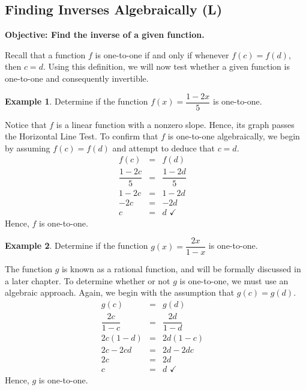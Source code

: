 \documentclass[12pt]{book}
\theoremstyle{definition}
\newtheorem{example}{Example}
\begin{document}
\subsection{Finding Inverses Algebraically (L)}
{\bf Objective: Find the inverse of a given function.}\par
Recall that a function $f$ is one-to-one if and only if whenever $f(c) = f(d)$, then $c=d$.  Using this definition, we will now test whether a given function is one-to-one and consequently invertible.
\begin{example} Determine if the function $f(x) = \dfrac{1-2x}{5}$ is one-to-one.\par
Notice that $f$ is a linear function with a nonzero slope.  Hence, its graph passes the Horizontal Line Test.  To confirm that $f$ is one-to-one algebraically, we begin by assuming $f(c) = f(d)$ and attempt to deduce that $c=d$. 
\[ \begin{array}{rclr}
f(c) & = & f(d) & \\ [3pt]
\dfrac{1-2c}{5} & = & \dfrac{1-2d}{5} & \\ [5pt]
1-2c & = & 1-2d & \\
-2c & = & -2d & \\
c & = & d \, \, \checkmark & 
\end{array} \]
Hence, $f$ is one-to-one.
\end{example}
\begin{example} Determine if the function $g(x) = \dfrac{2x}{1-x}$ is one-to-one.\par
The function $g$ is known as a rational function, and will be formally discussed in a later chapter.  To determine whether or not $g$ is one-to-one, we must use an algebraic approach.  Again, we begin with the assumption that $g(c) = g(d)$.
\[ \begin{array}{rclr}
g(c) & = & g(d) & \\ [3pt]
\dfrac{2c}{1-c} & = & \dfrac{2d}{1-d} & \\ [6pt]
2c(1-d) & = & 2d(1-c) & \\
2c - 2cd & = & 2d - 2dc & \\
2c & = & 2d & \\
c & = & d \, \, \checkmark  
\end{array} \]
Hence, $g$ is one-to-one.  
\end{example}
\end{document}
